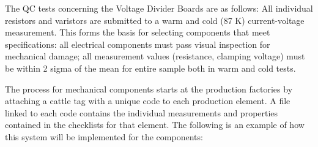 The QC tests concerning the Voltage Divider Boards are as follows: All individual resistors and
 varistors are submitted to a warm and cold (87 K) current-voltage measurement. This forms the basis for selecting components that meet specifications: all
 electrical components must pass visual inspection for mechanical damage; all measurement values (resistance, clamping voltage) must be within 2 sigma of the mean for entire sample both in warm and cold tests.


The  process for mechanical components starts at the production factories by attaching a cattle tag with a unique code to each production element.  A file linked to each code contains the individual measurements and properties contained in the  checklists for that element.  The following is an example of how this system will be implemented for the  components:

